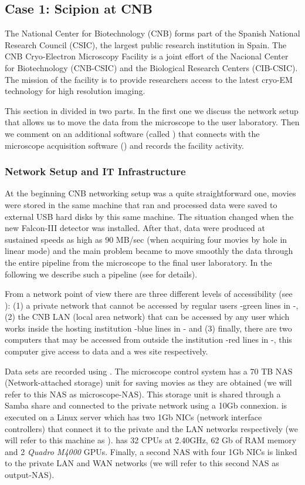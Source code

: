 \subsection{Case 1: Scipion at CNB}
The National Center for Biotechnology (CNB) forms part of the Spanish National Research Council (CSIC), the largest public research institution in Spain. 
The CNB Cryo-Electron Microscopy Facility is a joint effort of the Nacional Center for Biotechnology (CNB-CSIC) and the Biological Research Centers (CIB-CSIC). The mission of the facility is to provide researchers access to the latest cryo-EM technology for high resolution imaging. 

This section in divided in two parts. In the first one we discuss the network setup that allows us to move the data from the microscope to the user laboratory. Then  we comment on an additional software (called  \emadmin) that connects \scipion with the microscope acquisition software (\epu) and records the facility activity.

\subsubsection{Network Setup and IT Infrastructure}

At the beginning CNB networking setup was a quite straightforward one, movies were stored in the  same machine that ran \scipion and processed data were saved to external USB hard disks by this same machine. The situation changed when the new Falcon-III detector was installed. After that, data were produced at sustained speeds as high as 90 MB/sec (when acquiring four movies by hole in linear mode) and the main problem became to move smoothly the data through the entire pipeline from the microscope to the final user laboratory. In the following we describe such a pipeline (see  for details).

From a network point of view there are three different levels of accessibility (see \ffig): (1) a private network that cannot be accessed by regular users -green lines in -, (2) the CNB LAN (local area network)  that can be accessed by any user which works inside the hosting  institution -blue lines in - and (3) finally, there are two computers that may be accessed from outside the institution -red lines in -, this computer give access to data and a wes site respectively.

Data sets are recorded using \epu. The microscope control system has a 70 TB NAS (Network-attached storage) unit for saving movies as they are obtained (we will refer to this NAS as microscope-NAS). This storage unit is shared through a Samba share and connected to the private network using a 10Gb connexion. \scipion is executed on a Linux server which has two 1Gb NICs (network interface controllers) that connect it to the private and the LAN networks respectively (we will refer to this machine as \scipionbox). \scipionbox has 32 CPUs at 2.40GHz, 62 Gb of RAM memory and 2 \textit{Quadro M4000} GPUs. Finally, a second NAS with four 1Gb NICs is linked to the private LAN and WAN networks (we will refer to this second NAS as output-NAS).

